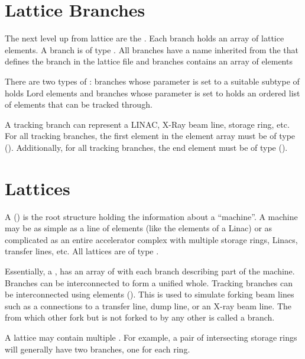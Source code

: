 \section{Lattice Branches}
\label{s:branch.def}

The next level up from lattice  are the .
Each branch holds an array of lattice elements. 
A branch is of type . All
branches have a name  inherited from the  that defines
the branch in the lattice file and branches contains an array of elements 

There are two types of : branches whose  parameter is set to
a suitable subtype of  holds Lord elements and 
branches whose  parameter is set to   holds an ordered
list of elements that can be tracked through.

A tracking branch can represent a LINAC, X-Ray beam line, storage ring, etc.
For all tracking branches, the first element in the element array
must be of type  ().
Additionally, for all tracking branches, 
the end element must be of type  ().

\section{Lattices}
\label{s:lattice.def}

A  () is the root structure holding the information about a
``machine''. A machine may be as simple as a line of elements (like the elements of a Linac) or
as complicated as an entire accelerator complex with multiple storage rings, Linacs, transfer
lines, etc. All lattices are of type .

Essentially, a , has an array of  with each branch describing part of the
machine. Branches can be interconnected to form a unified whole.
Tracking branches can be interconnected using  elements (). 
This is used to simulate forking beam lines such as a connections to a transfer line, dump line, or an
X-ray beam line. The  from which other  fork but is not forked to by any
other  is called a  branch.

A lattice may contain multiple  . For example, a pair of intersecting storage
rings will generally have two  branches, one for each ring.

